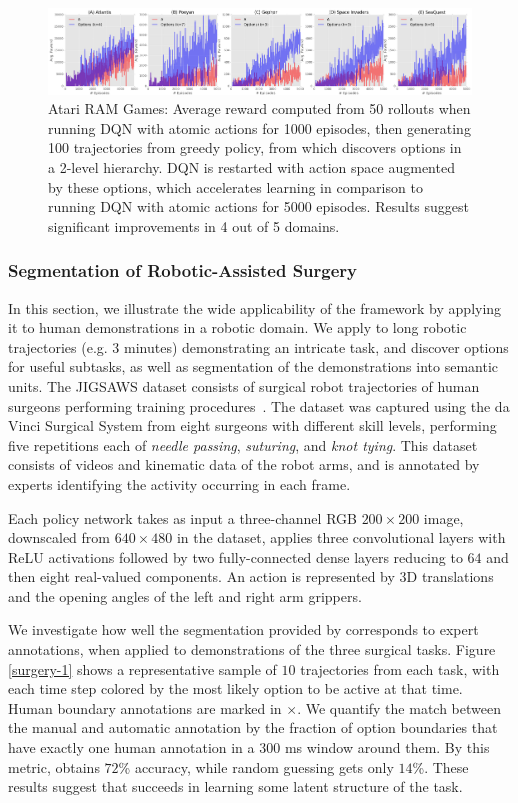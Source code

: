 \begin{figure}[ht]
    \centering
    \includegraphics[width=\textwidth]{ddco-experiments/exp5-atari.png}
    \caption{Atari RAM Games: Average reward computed from 50 rollouts when running DQN with atomic actions for 1000 episodes, then generating 100 trajectories from greedy policy, from which \alg discovers options in a 2-level hierarchy. DQN is restarted with action space augmented by these options, which accelerates learning in comparison to running DQN with atomic actions for 5000 episodes. Results suggest significant improvements in 4 out of 5 domains. \label{atari-1}}\vspace{-1em}
\end{figure}

\subsubsection{Segmentation of Robotic-Assisted Surgery}
In this section, we illustrate the wide applicability of the \alg framework by applying it to human demonstrations in a robotic domain. We apply \alg to long robotic trajectories (e.g. 3 minutes) demonstrating an intricate task, and discover options for useful subtasks, as well as segmentation of the demonstrations into semantic units.
The JIGSAWS dataset consists of surgical robot trajectories of human surgeons performing training procedures~\citep{gao2014jigsaws}. 
The dataset was captured using the da Vinci Surgical System from eight surgeons with different skill levels, performing five repetitions each of \emph{needle passing}, \emph{suturing}, and \emph{knot tying}.
This dataset consists of videos and kinematic data of the robot arms, and is annotated by experts identifying the activity occurring in each frame.

Each policy network takes as input a three-channel RGB $200 \times 200$ image, downscaled from $640 \times 480$ in the dataset, applies three convolutional layers with ReLU activations followed by two fully-connected dense layers reducing to $64$ and then eight real-valued components. An action is represented by 3D translations and the opening angles of the left and right arm grippers.

We investigate how well the segmentation provided by \alg corresponds to expert annotations, when applied to demonstrations of the three surgical tasks. Figure \ref{surgery-1} shows a representative sample of $10$ trajectories from each task, with each time step colored by the most likely option to be active at that time. Human boundary annotations are marked in $\times$. We quantify the match between the manual and automatic annotation by the fraction of option boundaries that have exactly one human annotation in a $300$ ms window around them. By this metric, \alg obtains $72$\% accuracy, while random guessing gets only $14$\%. These results suggest that \alg succeeds in learning some latent structure of the task.

